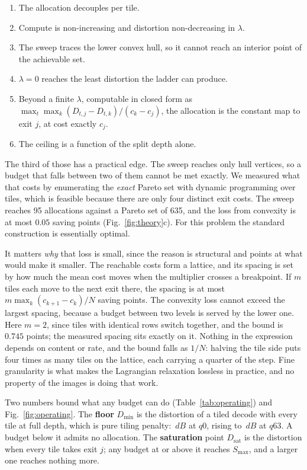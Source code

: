 \documentclass[10pt,twocolumn,letterpaper]{article}
\newcommand{\dB}{\,dB}
\begin{document}
\begin{enumerate}\itemsep1pt
\item The allocation decouples per tile.
\item Compute is non-increasing and distortion non-decreasing in $\lambda$.
\item The sweep traces the lower convex hull, so it cannot reach an interior
      point of the achievable set.
\item $\lambda{=}0$ reaches the least distortion the ladder can produce.
\item Beyond a finite $\lambda$, computable in closed form as
      $\max_t \max_k (D_{t,j}-D_{t,k})/(c_k-c_j)$, the allocation is the
      constant map to exit $j$, at cost exactly $c_j$.
\item The ceiling is a function of the split depth alone.
\end{enumerate}

The third of those has a practical edge. The sweep reaches only hull vertices, so
a budget that falls between two of them cannot be met exactly. We measured what
that costs by enumerating the \emph{exact} Pareto set with dynamic programming
over tiles, which is feasible because there are only four distinct exit costs. The
sweep reaches 95 allocations against a Pareto set of 635, and the loss from
convexity is at most $0.05$ saving points (Fig.~\ref{fig:theory}c). For this
problem the standard construction is essentially optimal.

It matters \emph{why} that loss is small, since the reason is structural and
points at what would make it smaller. The reachable costs form a lattice, and its
spacing is set by how much the mean cost moves when the multiplier crosses a
breakpoint. If $m$ tiles each move to the next exit there, the spacing is at most
$m\max_k(c_{k+1}-c_k)/N$ saving points. The convexity loss cannot exceed the
largest spacing, because a budget between two levels is served by the lower one.
Here $m{=}2$, since tiles with identical rows switch together, and the bound is
$0.745$ points; the measured spacing sits exactly on it. Nothing in the
expression depends on content or rate, and the bound falls as $1/N$: halving the
tile side puts four times as many tiles on the lattice, each carrying a quarter
of the step. Fine granularity is what makes the Lagrangian relaxation lossless in
practice, and no property of the images is doing that work.

Two numbers bound what any budget can do (Table~\ref{tab:operating}) and Fig.~\ref{fig:operating}. The
\textbf{floor} $D_{\min}$ is the distortion of a tiled decode with every tile at
full depth, which is pure tiling penalty: \FloorLow$\dB$ at $q0$, rising to
\FloorHigh$\dB$ at $q63$. A budget below it admits no allocation. The
\textbf{saturation} point $D_{\mathrm{sat}}$ is the distortion when every tile
takes exit $j$; any budget at or above it reaches $S_{\max}$, and a larger one
reaches nothing more.
\end{document}
